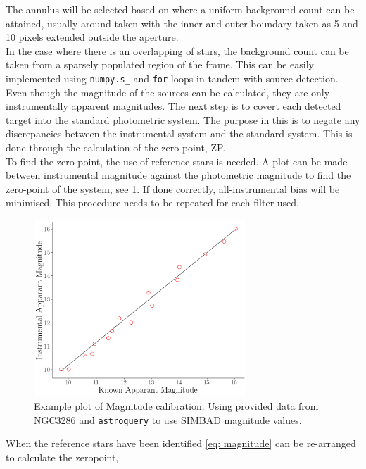 The annulus will be selected based on where a uniform background count can be attained, usually around taken with the inner and outer boundary taken as 5 and 10 pixels extended outside the aperture. \\ In the case where there is an overlapping of stars, the background count can be taken from a sparsely populated region of the frame. This can be easily implemented using \verb|numpy.s_| and \verb|for| loops in tandem with source detection.   \\

Even though the magnitude of the sources can be calculated, they are only instrumentally apparent magnitudes. The next step is to covert each detected target into the standard photometric system. The purpose in this is to negate any discrepancies between the instrumental system and the standard system. This is done through the calculation of the zero point, ZP. \\ 

To find the zero-point, the use of reference stars is needed. A plot can be made between instrumental magnitude against the photometric magnitude to find the zero-point \cite[Ch. 6.1]{budding_o_2007} of the system, see \cref{fig: magnitude_test}. If done correctly, all-instrumental bias will be minimised. This procedure needs to be repeated for each filter used. 

\begin{figure}[h!]
    \centering
    \includegraphics[width = 8cm]{figures/magnitud_calibration.png}
    \caption{Example plot of Magnitude calibration. Using provided data from NGC3286 and \texttt{astroquery} to use SIMBAD magnitude values.}
    \label{fig: magnitude_test}
\end{figure}

When the reference stars have been identified \cref{eq: magnitude} can be re-arranged to calculate the zeropoint,

